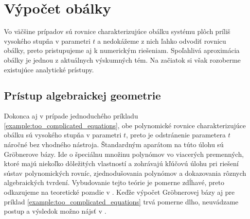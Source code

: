 \section{Výpočet obálky}
Vo väčšine prípadov sú rovnice charakterizujúce obálku systému plôch príliš vysokého stupňa v parametri $t$ a nedokážeme z nich ľahko odvodiť rovnicu obálky, preto pristupujeme aj k numerickým riešeniam. Spoľahlivá aproximácia obálky je jednou z aktuálnych výskumných tém. Na začiatok si však rozoberme existujúce analytické prístupy.
\subsection{Prístup algebraickej geometrie}
Dokonca aj v prípade jednoduchého príkladu \ref{example:too_complicated_equations}, obe polynomické rovnice charakterizujúce obálku sú vysokého stupňa v parametri $t$, preto je odstránenie parametera $t$ náročné bez vhodného nástroja. Štandardným aparátom na túto úlohu sú Gröbnerove bázy. Ide o špeciálnu množinu polynómov vo viacerých premenných, ktoré majú niekoľko dôležitých vlastností a zohrávajú kľúčovú úlohu pri riešení sústav polynomických rovníc, zjednodušovania polynómov a dokazovania rôznych algebraických tvrdení. Vybudovanie tejto teórie je pomerne zdĺhavé, preto odkazujeme na teoretické pozadie v \cite{Chalm}.
Keďže výpočet Gröbnerovej bázy aj pre príklad \ref{example:too_complicated_equations} trvá pomerne dlho, neuvádzame postup a výsledok možno nájsť v  . 


